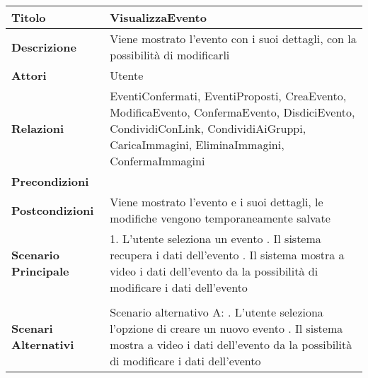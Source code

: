 \begin{tabular} {|P{4.5cm}|P{12.5cm}|}
  \hline
  \textbf{Titolo}                   & VisualizzaEvento                                                                                                                                                                                   \\
  \hline
  \textbf{Descrizione}              & Viene mostrato l'evento con i suoi dettagli, con la possibilità di modificarli                                                                                                                     \\
  \hline
  \textbf{Attori}                   & Utente                                                                                                                                                                                             \\
  \hline
  \textbf{Relazioni}                & EventiConfermati, EventiProposti, CreaEvento, ModificaEvento, ConfermaEvento, DisdiciEvento, CondividiConLink, CondividiAiGruppi, CaricaImmagini, EliminaImmagini, ConfermaImmagini                \\
  \hline
  \textbf{Precondizioni}            &                                                                                                                                                                                                    \\
  \hline
  \textbf{Postcondizioni}           & Viene mostrato l'evento e i suoi dettagli, le modifiche vengono temporaneamente salvate                                                                                                            \\
  \hline
  \textbf{Scenario Principale}      & 1. L'utente seleziona un evento . Il sistema recupera i dati dell'evento . Il sistema mostra a video i dati dell'evento da la possibilità di modificare i dati dell'evento \\                                                                                                                                                                                            \\
  \hline
  \textbf{Scenari Alternativi}      & Scenario alternativo A: . L'utente seleziona l'opzione di creare un nuovo evento . Il sistema mostra a video i dati dell'evento da la possibilità di modificare i dati dell'evento         \linebreak

\end{tabular}
